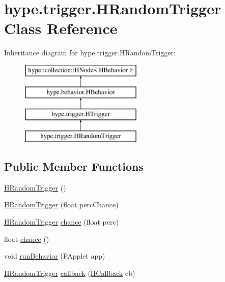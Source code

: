 \hypertarget{classhype_1_1trigger_1_1_h_random_trigger}{\section{hype.\-trigger.\-H\-Random\-Trigger Class Reference}
\label{classhype_1_1trigger_1_1_h_random_trigger}
}
Inheritance diagram for hype.\-trigger.\-H\-Random\-Trigger\-:\begin{figure}[H]
\begin{center}
\leavevmode
\includegraphics[height=4.000000cm]{classhype_1_1trigger_1_1_h_random_trigger}
\end{center}
\end{figure}
\subsection*{Public Member Functions}
\begin{DoxyCompactItemize}
\item 
\hyperlink{classhype_1_1trigger_1_1_h_random_trigger_ab6a9e9c5029eebea0c9026d7f3b12852}{H\-Random\-Trigger} ()
\item 
\hyperlink{classhype_1_1trigger_1_1_h_random_trigger_acb6611efb7275920a232ea3d79273d75}{H\-Random\-Trigger} (float perc\-Chance)
\item 
\hyperlink{classhype_1_1trigger_1_1_h_random_trigger}{H\-Random\-Trigger} \hyperlink{classhype_1_1trigger_1_1_h_random_trigger_a06de82722bf8de5c47dfa14f7883ac5d}{chance} (float perc)
\item 
float \hyperlink{classhype_1_1trigger_1_1_h_random_trigger_a32a9dc31869457b4eab4310c5fbc4fbc}{chance} ()
\item 
void \hyperlink{classhype_1_1trigger_1_1_h_random_trigger_a449344804ddd737ccd51da251ef156ca}{run\-Behavior} (P\-Applet app)
\item 
\hyperlink{classhype_1_1trigger_1_1_h_random_trigger}{H\-Random\-Trigger} \hyperlink{classhype_1_1trigger_1_1_h_random_trigger_aa2d51be660dca443e09a2bcc0c128231}{callback} (\hyperlink{interfacehype_1_1interfaces_1_1_h_callback}{H\-Callback} cb)
\end{DoxyCompactItemize}
